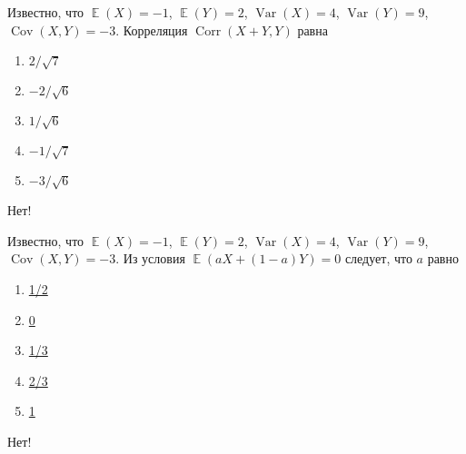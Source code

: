 \documentclass[t]{beamer}
\DeclareMathOperator{\Var}{Var}
\DeclareMathOperator{\Cov}{Cov}
\DeclareMathOperator{\Corr}{Corr}
\DeclareMathOperator{\E}{\mathbb{E}}
\begin{document}
 \begin{frame} \label{21-No} 
\begin{block}{21} 

Известно, что $\E(X)=-1$, $\E(Y)=2$, $\Var(X)=4$, $\Var(Y)=9$, $\Cov(X,Y)=-3$. Корреляция $\Corr(X+Y, Y)$ равна


 \end{block} 
\begin{enumerate} 
\item[] \hyperlink{21-Yes}{\beamergotobutton{}  $2/\sqrt7$ }
\item[] \hyperlink{21-No}{\beamergotobutton{}  $-2/\sqrt6$ }
\item[] \hyperlink{21-No}{\beamergotobutton{}  $1/\sqrt6$  }
\item[] \hyperlink{21-No}{\beamergotobutton{}  $-1/\sqrt7 $ }
\item[] \hyperlink{21-No}{\beamergotobutton{}  $-3/\sqrt6$ }
\end{enumerate} 

 \alert{Нет!} 
\end{frame} 


 \begin{frame} \label{22-No} 
\begin{block}{22} 

Известно, что $\E(X)=-1$, $\E(Y)=2$, $\Var(X)=4$, $\Var(Y)=9$, $\Cov(X,Y)=-3$. Из условия  $\E(aX+(1-a)Y)=0$ следует, что $a$ равно


 \end{block} 
\begin{enumerate} 
\item[] \hyperlink{22-No}{\beamergotobutton{}  1/2 }
\item[] \hyperlink{22-No}{\beamergotobutton{}  0 }
\item[] \hyperlink{22-No}{\beamergotobutton{}  1/3 }
\item[] \hyperlink{22-Yes}{\beamergotobutton{}  2/3 }
\item[] \hyperlink{22-No}{\beamergotobutton{}  1 }
\end{enumerate} 

 \alert{Нет!} 
\end{frame} 
\end{document}
